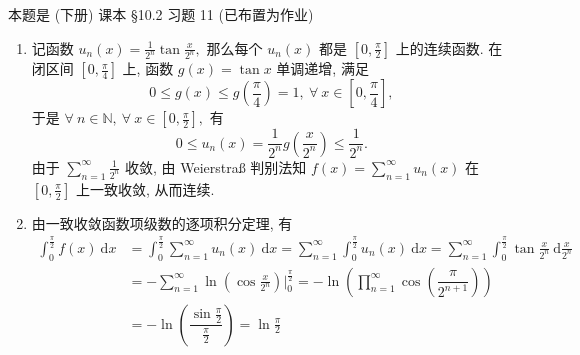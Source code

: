 \begin{solution}
本题是 (下册) 课本 \S 10.2 习题 11 (已布置为作业)

\begin{enumerate}
\item 记函数 $u_n(x) = \frac{1}{2^n} \tan \frac{x}{2^n},$ 那么每个 $u_n(x)$ 都是 $\left[ 0, \frac{\pi}{2} \right]$ 上的连续函数. 在闭区间 $\left[ 0, \frac{\pi}{4} \right]$ 上, 函数 $g(x) = \tan x$ 单调递增, 满足
\begin{equation*}
0 \leqslant g(x) \leqslant g\left( \frac{\pi}{4} \right) = 1, ~ \forall ~ x \in \left[ 0, \frac{\pi}{4} \right],
\end{equation*}
于是 $\forall ~ n \in \mathbb{N}, ~ \forall ~ x \in \left[ 0, \frac{\pi}{2} \right],$ 有
\begin{equation*}
0 \leqslant u_n(x) = \frac{1}{2^n} g \left( \frac{x}{2^n} \right) \leqslant \frac{1}{2^n}.
\end{equation*}
由于 $\displaystyle \sum_{n=1}^{\infty} \frac{1}{2^n}$ 收敛, 由 Weierstraß 判别法知 $\displaystyle f(x) = \sum_{n=1}^{\infty} u_n(x)$ 在 $\left[ 0, \frac{\pi}{2} \right]$ 上一致收敛, 从而连续.

\item 由一致收敛函数项级数的逐项积分定理, 有
\begin{align*}
\int_{0}^{\frac{\pi}{2}} f(x) ~ \mathrm{d}x & = \int_{0}^{\frac{\pi}{2}} \sum_{n=1}^{\infty} u_n(x) ~ \mathrm{d}x = \sum_{n=1}^{\infty} \int_{0}^{\frac{\pi}{2}} u_n(x) ~ \mathrm{d}x = \sum_{n=1}^{\infty} \int_{0}^{\frac{\pi}{2}} \tan \frac{x}{2^n} ~ \mathrm{d} \frac{x}{2^n} \\
& = -\sum_{n=1}^{\infty} \ln \left( \cos \frac{x}{2^n} \right) \bigg|_{0}^{\frac{\pi}{2}} = -\ln \left( \prod_{n=1}^{\infty} \cos \left( \dfrac{\pi}{2^{n+1}} \right) \right) \\
& = -\ln \left( \dfrac{\sin \frac{\pi}{2}}{\frac{\pi}{2}} \right) = \ln \frac{\pi}{2}
\end{align*}
\end{enumerate}
\end{solution}



